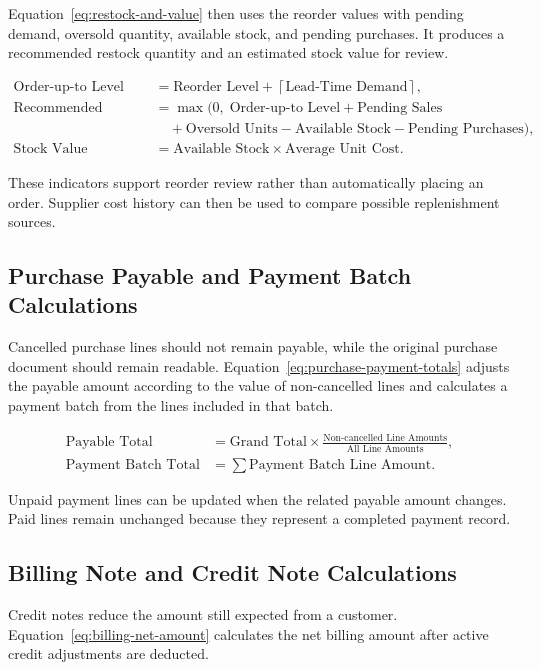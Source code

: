 Equation~\ref{eq:restock-and-value} then uses the reorder values with pending demand, oversold quantity, available stock, and pending purchases. It produces a recommended restock quantity and an estimated stock value for review.

\begin{equation}
\label{eq:restock-and-value}
\begin{aligned}
\text{Order-up-to Level} &= \text{Reorder Level}+\left\lceil\text{Lead-Time Demand}\right\rceil,\\
\text{Recommended Restock} &= \max(0,\;\text{Order-up-to Level}+\text{Pending Sales}\\
&\quad+\text{Oversold Units}-\text{Available Stock}-\text{Pending Purchases}),\\
\text{Stock Value} &= \text{Available Stock}\times\text{Average Unit Cost}.
\end{aligned}
\end{equation}

These indicators support reorder review rather than automatically placing an order. Supplier cost history can then be used to compare possible replenishment sources.

\subsection{Purchase Payable and Payment Batch Calculations}
Cancelled purchase lines should not remain payable, while the original purchase document should remain readable. Equation~\ref{eq:purchase-payment-totals} adjusts the payable amount according to the value of non-cancelled lines and calculates a payment batch from the lines included in that batch.

\begin{equation}
\label{eq:purchase-payment-totals}
\begin{aligned}
\text{Payable Total} &= \text{Grand Total}\times
\frac{\text{Non-cancelled Line Amounts}}{\text{All Line Amounts}},\\
\text{Payment Batch Total} &= \sum \text{Payment Batch Line Amount}.
\end{aligned}
\end{equation}

Unpaid payment lines can be updated when the related payable amount changes. Paid lines remain unchanged because they represent a completed payment record.

\subsection{Billing Note and Credit Note Calculations}
Credit notes reduce the amount still expected from a customer. Equation~\ref{eq:billing-net-amount} calculates the net billing amount after active credit adjustments are deducted.

